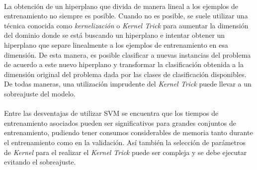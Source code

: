 \paragraph{}La obtención de un hiperplano que divida de manera lineal a los ejemplos de entrenamiento no siempre es posible.
Cuando no es posible, se suele utilizar una técnica conocida como \textit{kernelización} o \textit{Kernel Trick} para aumentar la dimensión del dominio donde se está buscando un hiperplano e intentar obtener un hiperplano que separe linealmente a los ejemplos de entrenamiento en esa dimensión.
De esta manera, es posible clasificar a nuevas instancias del problema de acuerdo a este nuevo hiperplano y transformar la clasificación obtenida a la dimensión original del problema dada por las clases de clasificación disponibles.
De todas maneras, una utilización imprudente del \textit{Kernel Trick} puede llevar a un sobreajuste del modelo.

\paragraph{}Entre las desventajas de utilizar SVM se encuentra que los tiempos de entrenamiento asociados pueden ser significativos para grandes conjuntos de entrenamiento, pudiendo tener consumos considerables de memoria tanto durante el entrenamiento como en la validación.
Así también la selección de parámetros de \textit{Kernel} para el realizar el \textit{Kernel Trick} puede ser compleja y se debe ejecutar evitando el sobreajuste.